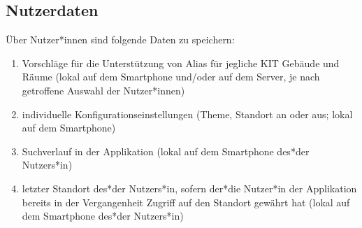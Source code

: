\subsection{Nutzerdaten}

Über Nutzer*innen sind folgende Daten zu speichern:
\begin{enumerate}[label=\textbf{/D\arabic*0/}, align=left]
	\item Vorschläge für die Unterstützung von Alias für jegliche KIT Gebäude und Räume (lokal auf dem Smartphone und/oder auf dem Server, je nach getroffene Auswahl der Nutzer*innen)
	\item individuelle Konfigurationseinstellungen (Theme, Standort an oder aus; lokal auf dem Smartphone)
	\item Suchverlauf in der Applikation (lokal auf dem Smartphone des*der Nutzers*in)
	\item letzter Standort des*der Nutzers*in, sofern der*die Nutzer*in der Applikation bereits in der Vergangenheit Zugriff auf den Standort gewährt hat (lokal auf dem Smartphone des*der Nutzers*in)
\end{enumerate}